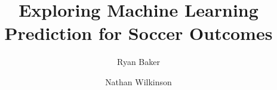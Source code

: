 \documentclass[sigconf, 11pt]{acmart}
\begin{document}
\title{Exploring Machine Learning Prediction for Soccer Outcomes}


\author{Ryan Baker}

\author{Nathan Wilkinson}


\begin{abstract}
 
\end{abstract}

\maketitle




 
\end{document}
